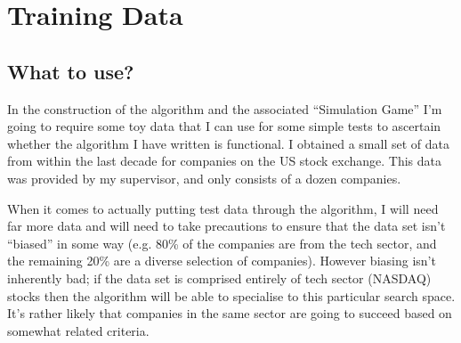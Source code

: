 \section{Training Data}
\subsection{What to use?}
In the construction of the algorithm and the associated ``Simulation Game'' I'm going to require some toy data that I can use for some simple tests to ascertain whether the algorithm I have written is functional. I obtained a small set of data from within the last decade for companies on the US stock exchange. This data was provided by my supervisor, and only consists of a dozen companies. \newline

When it comes to actually putting test data through the algorithm, I will need far more data and will need to take precautions to ensure that the data set isn't ``biased'' in some way (e.g. 80\% of the companies are from the tech sector, and the remaining 20\% are a diverse selection of companies). However biasing isn't inherently bad; if the data set is comprised entirely of tech sector (NASDAQ) stocks then the algorithm will be able to specialise to this particular search space. It's rather likely that companies in the same sector are going to succeed based on somewhat related criteria.

